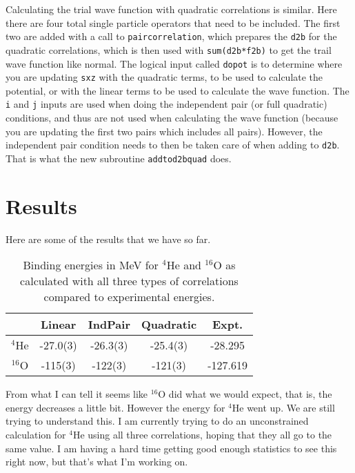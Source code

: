 \documentclass[12pt]{article}
\begin{document}
Calculating the trial wave function with quadratic correlations is similar. Here there are four total single particle operators that need to be included. The first two are added with a call to \texttt{paircorrelation}, which prepares the \texttt{d2b} for the quadratic correlations, which is then used with \texttt{sum(d2b*f2b)} to get the trail wave function like normal. The logical input called \texttt{dopot} is to determine where you are updating \texttt{sxz} with the quadratic terms, to be used to calculate the potential, or with the linear terms to be used to calculate the wave function. The \texttt{i} and \texttt{j} inputs are used when doing the independent pair (or full quadratic) conditions, and thus are not used when calculating the wave function (because you are updating the first two pairs which includes all pairs). However, the independent pair condition needs to then be taken care of when adding to \texttt{d2b}. That is what the new subroutine \texttt{addtod2bquad} does.

\section{Results}
Here are some of the results that we have so far.
\begin{table}[h!]
   \centering
   \caption{Binding energies in MeV for $^4$He and $^{16}$O as calculated with all three types of correlations compared to experimental energies.}
   \label{tab:indpairresults}
   \begin{tabular}{ccccc}
      \hline \hline
       & Linear & IndPair & Quadratic & Expt.\\
      \hline
      $^4$He & -27.0(3) & -26.3(3) & -25.4(3) & -28.295\\
      $^{16}$O & -115(3) & -122(3) & -121(3) & -127.619\\
      \hline \hline
   \end{tabular}
\end{table}

From what I can tell it seems like $^{16}$O did what we would expect, that is, the energy decreases a little bit. However the energy for $^4$He went up. We are still trying to understand this. I am currently trying to do an unconstrained calculation for $^4$He using all three correlations, hoping that they all go to the same value. I am having a hard time getting good enough statistics to see this right now, but that's what I'm working on.

%
%
\end{document}
